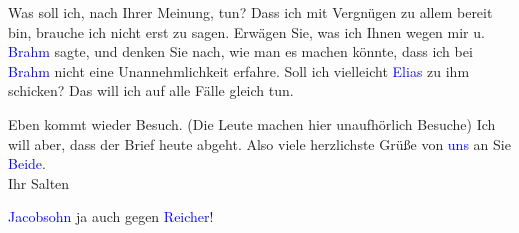 \pstart
           Was soll ich, nach Ihrer Meinung, tun? Dass ich mit Vergnügen zu allem bereit bin,
               brauche ich nicht erst zu sagen. Erwägen Sie, was ich Ihnen wegen mir u. \textcolor{blue}{Brahm}{}\ledrightnote{\textcolor{blue}{Otto Brahm}} sagte, und denken Sie nach, wie man es
               machen könnte, dass ich bei \textcolor{blue}{Brahm}{}\ledrightnote{\textcolor{blue}{Otto Brahm}} nicht eine
               Unannehmlichkeit erfahre. Soll ich vielleicht \textcolor{blue}{Elias}{}\ledrightnote{\textcolor{blue}{Julius Elias}} zu ihm schicken? Das will ich auf alle Fälle gleich tun.\pend
           
\pstart
           Eben kommt wieder Besuch. (Die Leute machen hier unaufhörlich Besuche) Ich will aber,
               dass der Brief heute abgeht. Also viele herzlichste
               Grüße von \textcolor{blue}{uns}{}\ledrightnote{{$\rightarrow$}\textcolor{blue}{Ottilie Salten}} an Sie \textcolor{blue}{Beide}{}\ledrightnote{{$\rightarrow$}\textcolor{blue}{Olga Schnitzler}}. {\\}Ihr
                  \spacefill\mbox{Salten}\pend
           
\pstart
           \noindent{}\label{K_L03421-7v}\label{K_L03421-7h}{ }\textcolor{blue}{Jacobsohn}{}\ledrightnote{\textcolor{blue}{Siegfried Jacobsohn}}{ }\label{K_L03421-6v}\label{K_L03421-6h} ja auch
                  gegen \textcolor{blue}{Reicher}{}\ledrightnote{\textcolor{blue}{Emanuel Reicher}}!\pend
           \endnumbering{}  
      